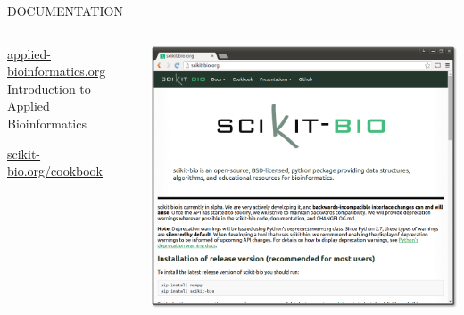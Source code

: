\documentclass[final,t]{beamer}
\begin{document}
\begin{frame}{}
\begin{columns}[t]
\begin{column}{.3\linewidth}
\begin{block}{\uppercase{Documentation}}
\begin{columns}
\begin{column}{.45\linewidth}
\begin{minipage}[c][15cm][c]{\linewidth}
                    \end{minipage}
                    \begin{minipage}[c][15cm][c]{\linewidth}
                        \href{http://applied-bioinformatics.org}{\color{blue}\underline{applied-bioinformatics.org}}
                        \newline\newline
                        Introduction to Applied Bioinformatics
                    \end{minipage}
                    \begin{minipage}[c][15cm][c]{\linewidth}
                        \href{http://scikit-bio.org/cookbook}{\color{blue}\underline{scikit-bio.org/cookbook}}
                        \newline\newline
                    \end{minipage}
                \end{column}
                \begin{column}{.45\linewidth}
                    \begin{minipage}[c][15cm][c]{\linewidth}
                    \includegraphics[width=1\linewidth]{assets/website}\\
                \end{minipage}
                        \begin{minipage}[c][15cm][c]{\linewidth}

\end{minipage}
\end{column}
\end{columns}
\end{block}
\end{column}
\end{columns}
\end{frame}
\end{document}
